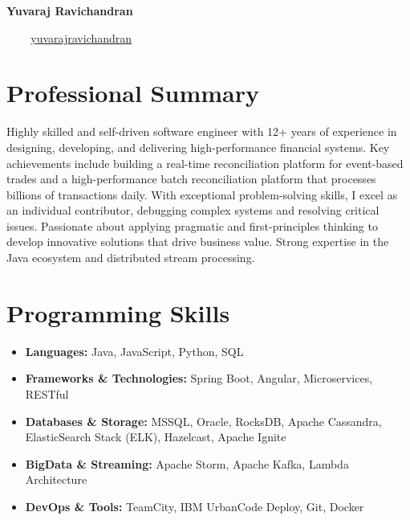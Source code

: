 \documentclass[11pt, a4paper]{article}
\newcommand{\resumeSubHeadingListStart}{\begin{itemize}[leftmargin=*]}
\newcommand{\resumeSubHeadingListEnd}{\end{itemize}}
\newcommand{\contactInfo}[3]{
    \centerline{
        \faEnvelope\ #1 \quad
        \faPhone\ #2 \quad
        \faLinkedin\ #3
    }
    \vspace{1em}
}
\newcommand{\summary}[1]{
    {\par\small\setlength{\parindent}{0pt}#1\par}
}
\begin{document}
\begin{center}
  {\Huge\bfseries Yuvaraj Ravichandran}
\end{center}

\contactInfo{\href{mailto:\email}{\email}}{\mobile}{\href{https://www.linkedin.com/in/yuvarajravichandran}{yuvarajravichandran}}

\section{Professional Summary}
\summary{Highly skilled and self-driven software engineer with 12+ years of experience in designing, developing, and delivering high-performance financial systems. Key achievements include building a real-time reconciliation platform for event-based trades and a high-performance batch reconciliation platform that processes billions of transactions daily. With exceptional problem-solving skills, I excel as an individual contributor, debugging complex systems and resolving critical issues. Passionate about applying pragmatic and first-principles thinking to develop innovative solutions that drive business value. Strong expertise in the Java ecosystem and distributed stream processing.}

\section{Programming Skills}
  \resumeSubHeadingListStart
    \item{
      \textbf{Languages:} Java, JavaScript, Python, SQL
    }
    \item{
      \textbf{Frameworks \& Technologies:} Spring Boot, Angular, Microservices, RESTful
    }
    \item{
      \textbf{Databases \& Storage:} MSSQL, Oracle, RocksDB, Apache Cassandra, ElasticSearch Stack (ELK), Hazelcast, Apache Ignite
    }
    \item{
      \textbf{BigData \& Streaming:} Apache Storm, Apache Kafka, Lambda Architecture
    }
    \item{
      \textbf{DevOps \& Tools:} TeamCity, IBM UrbanCode Deploy, Git, Docker
    }
 \resumeSubHeadingListEnd

\end{document}
